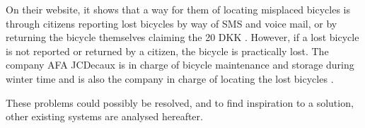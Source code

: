 On their website, it shows that a way for them of locating misplaced bicycles is through citizens reporting lost bicycles by way of SMS and voice mail, or by returning the bicycle themselves claiming the 20 DKK \citep{misc:aalborgbycykelmangler}.
However, if a lost bicycle is not reported or returned by a citizen, the bicycle is practically lost.
The company AFA JCDecaux is in charge of bicycle maintenance and storage during winter time and is also the company in charge of locating the lost bicycles \citep{misc:aalborgcykling}.


These problems could possibly be resolved, and to find inspiration to a solution, other existing systems are analysed hereafter.

